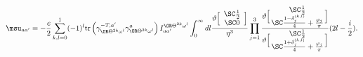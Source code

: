 \begin{equation}
\msu_{aa'}=-\frac{c}{2}\sum_{k,l=0}^1 (-1)^l
\text{tr}\left(\gamma_{\OR\Theta^{2k}\omega^l}^{-T,a'}\gamma_{\OR\Theta^{2k}\omega^l}^{a}\right)
 I^{\OR\Theta^{2k}\omega^l}_{aa'}  \int_0^{\infty}dl
\frac{\vartheta \Bigl[ \begin{array}{c} \SC \frac{1}{2} \\ \SC 0 \end{array} \Bigr]}{\eta^3}
\prod_{j=1}^3 
\frac{\vartheta \Bigl[\!\! \begin{array}{c}  \SC \frac{1}{2} \\ \SC \frac{1-\delta^{(k,l)}_j}{4}+\frac{\varphi_j}{\pi}    
\end{array} \!\!\Bigr]}
  {\vartheta \Bigl[\!\! \begin{array}{c}  \SC \frac{1}{2} \\  \SC \frac{1+\delta^{(k,l)}_j}{4}+\frac{\varphi_j}{\pi}
 \end{array} \!\!\Bigr]}
(2l-\frac{i}{2}).\label{FormulaTreeMSaa}
\end{equation}

